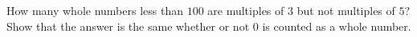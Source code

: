 How many whole numbers less than $100$ are multiples of $3$ but not multiples of $5$? Show that the answer is the same whether or not $0$ is counted as a whole number.
